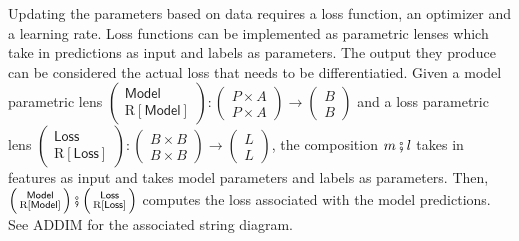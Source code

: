 \documentclass[11pt,a4paper,openright,twoside]{report}
\theoremstyle{plain}
\theoremstyle{definition}
\begin{document}
Updating the parameters based on data requires a loss function, an optimizer and a learning rate. Loss functions can be implemented as parametric lenses which take in predictions as input and labels as parameters. The output they produce can be considered the actual loss that needs to be differentiatied. Given a model parametric lens $\left(\begin{smallmatrix} \mathsf{Model} \\ \mathrm{R}[\mathsf{Model}] \end{smallmatrix}\right):\left(\begin{smallmatrix} P \times A \\ P \times A \end{smallmatrix}\right) \to \left(\begin{smallmatrix} B \\ B \end{smallmatrix}\right)$ and a loss parametric lens $\left(\begin{smallmatrix} \mathsf{Loss} \\ \mathrm{R}[\mathsf{Loss}] \end{smallmatrix}\right):\left(\begin{smallmatrix} B \times B\\ B \times B \end{smallmatrix}\right) \to \left(\begin{smallmatrix} L \\ L \end{smallmatrix}\right)$, the composition $m \fatsemi l$ takes in features as input and takes model parameters and labels as parameters. Then, $\left(\begin{smallmatrix} \mathsf{Model} \\ \mathrm{R}[\mathsf{Model}] \end{smallmatrix}\right) \fatsemi \left(\begin{smallmatrix} \mathsf{Loss} \\ \mathrm{R}[\mathsf{Loss}] \end{smallmatrix}\right)$ computes the loss associated with the model predictions. See ADDIM for the associated string diagram.
\end{document}
